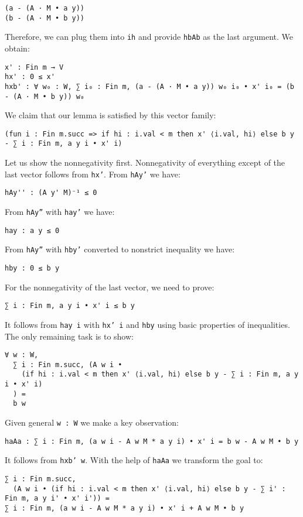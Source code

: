 \documentclass[]{article}
\renewcommand{\.}{\hskip .75pt}
\begin{document}
\begin{lstlisting}
(a - (A · M • a y))
(b - (A · M • b y))
\end{lstlisting}
Therefore, we can plug them into \texttt{ih} and provide \texttt{hbAb} as the last argument.
We obtain:
\begin{lstlisting}
x' : Fin m → V
hx' : 0 ≤ x'
hxb' : ∀ w₀ : W, ∑ i₀ : Fin m, (a - (A · M • a y)) w₀ i₀ • x' i₀ = (b - (A · M • b y)) w₀
\end{lstlisting}
We claim that our lemma is satisfied by this vector family:
\begin{lstlisting}
(fun i : Fin m.succ => if hi : i.val < m then x' ⟨i.val, hi⟩ else b y - ∑ i : Fin m, a y i • x' i)
\end{lstlisting}
Let us show the nonnegativity first.
Nonnegativity of everything except of the last vector follows from \texttt{hx'}.
From \texttt{hAy'} we have:
\begin{lstlisting}
hAy'' : (A y' M)⁻¹ ≤ 0
\end{lstlisting}
From \texttt{hAy''} with \texttt{hay'} we have:
\begin{lstlisting}
hay : a y ≤ 0
\end{lstlisting}
From \texttt{hAy''} with \texttt{hby'} converted to nonstrict inequality we have:
\begin{lstlisting}
hby : 0 ≤ b y
\end{lstlisting}
For the nonnegativity of the last vector, we need to prove:
\begin{lstlisting}
∑ i : Fin m, a y i • x' i ≤ b y
\end{lstlisting}
It follows from \texttt{hay i} with \texttt{hx' i} and \texttt{hby} using basic properties of inequalities.
The only remaining task is to show:
\begin{lstlisting}
∀ w : W, 
  ∑ i : Fin m.succ, (A w i •
    (if hi : i.val < m then x' ⟨i.val, hi⟩ else b y - ∑ i : Fin m, a y i • x' i)
  ) =
  b w
\end{lstlisting}
Given general \texttt{w :~W} we make a key observation:
\begin{lstlisting}
haAa : ∑ i : Fin m, (a w i - A w M * a y i) • x' i = b w - A w M • b y
\end{lstlisting}
It follows from \texttt{hxb' w}. With the help of \texttt{haAa} we transform the goal to:
\begin{lstlisting}
∑ i : Fin m.succ,
  (A w i • (if hi : i.val < m then x' ⟨i.val, hi⟩ else b y - ∑ i' : Fin m, a y i' • x' i')) =
∑ i : Fin m, (a w i - A w M * a y i) • x' i + A w M • b y
\end{lstlisting}
\end{document}
